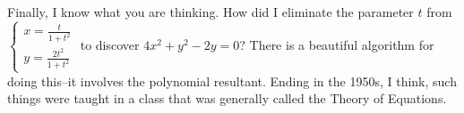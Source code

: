 \documentclass[12pt,fleqn]{exam}
\begin{document}
\begin{questions}
\begin{parts}
\begin{solution}[3.5in]
\quad Finally, I know what you are thinking.  How did I eliminate the parameter $t$ from  $\begin{cases} x =  \frac{t}{1+t^2} \\ y = \frac{2t^2}{1+ t^2} 
\end{cases}$ to discover $4 x^2 + y^2 - 2 y = 0$?  There is a beautiful algorithm for doing this--it involves the polynomial
resultant. Ending in the 1950s, I think, such things were taught in a class that was generally called the Theory of Equations.


\end{solution}

\end{parts}
\end{questions}
    
\end{document}
